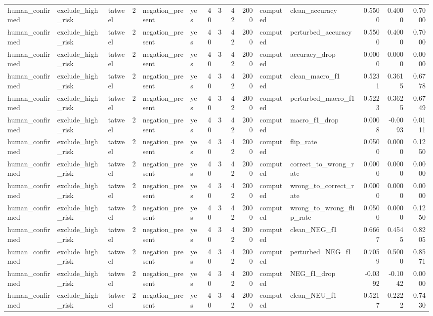 \begin{tabular}{lllrllrrrrllrrr}
human_confirmed & exclude_high_risk & tatweel & 2 & negation_present & yes & 40 & 3 & 42 & 2000 & computed & clean_accuracy & 0.5500 & 0.4000 & 0.7000 \\
human_confirmed & exclude_high_risk & tatweel & 2 & negation_present & yes & 40 & 3 & 42 & 2000 & computed & perturbed_accuracy & 0.5500 & 0.4000 & 0.7000 \\
human_confirmed & exclude_high_risk & tatweel & 2 & negation_present & yes & 40 & 3 & 42 & 2000 & computed & accuracy_drop & 0.0000 & 0.0000 & 0.0000 \\
human_confirmed & exclude_high_risk & tatweel & 2 & negation_present & yes & 40 & 3 & 42 & 2000 & computed & clean_macro_f1 & 0.5231 & 0.3615 & 0.6778 \\
human_confirmed & exclude_high_risk & tatweel & 2 & negation_present & yes & 40 & 3 & 42 & 2000 & computed & perturbed_macro_f1 & 0.5223 & 0.3625 & 0.6749 \\
human_confirmed & exclude_high_risk & tatweel & 2 & negation_present & yes & 40 & 3 & 42 & 2000 & computed & macro_f1_drop & 0.0008 & -0.0093 & 0.0111 \\
human_confirmed & exclude_high_risk & tatweel & 2 & negation_present & yes & 40 & 3 & 42 & 2000 & computed & flip_rate & 0.0500 & 0.0000 & 0.1250 \\
human_confirmed & exclude_high_risk & tatweel & 2 & negation_present & yes & 40 & 3 & 42 & 2000 & computed & correct_to_wrong_rate & 0.0000 & 0.0000 & 0.0000 \\
human_confirmed & exclude_high_risk & tatweel & 2 & negation_present & yes & 40 & 3 & 42 & 2000 & computed & wrong_to_correct_rate & 0.0000 & 0.0000 & 0.0000 \\
human_confirmed & exclude_high_risk & tatweel & 2 & negation_present & yes & 40 & 3 & 42 & 2000 & computed & wrong_to_wrong_flip_rate & 0.0500 & 0.0000 & 0.1250 \\
human_confirmed & exclude_high_risk & tatweel & 2 & negation_present & yes & 40 & 3 & 42 & 2000 & computed & clean_NEG_f1 & 0.6667 & 0.4545 & 0.8205 \\
human_confirmed & exclude_high_risk & tatweel & 2 & negation_present & yes & 40 & 3 & 42 & 2000 & computed & perturbed_NEG_f1 & 0.7059 & 0.5000 & 0.8571 \\
human_confirmed & exclude_high_risk & tatweel & 2 & negation_present & yes & 40 & 3 & 42 & 2000 & computed & NEG_f1_drop & -0.0392 & -0.1042 & 0.0000 \\
human_confirmed & exclude_high_risk & tatweel & 2 & negation_present & yes & 40 & 3 & 42 & 2000 & computed & clean_NEU_f1 & 0.5217 & 0.2222 & 0.7430 \\

\end{tabular}
